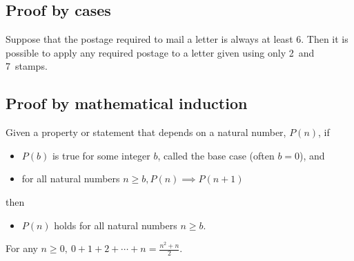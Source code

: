 \subsection{Proof by cases}

\begin{stmt2}
Suppose that the postage required to mail a letter is always at least 6\textcent. 
Then it is possible to apply any required postage to a letter given using only 2\textcent\ and 7\textcent\ stamps.
\end{stmt2}

\subsection{Proof by mathematical induction}

\begin{axiom}
Given a property or statement that depends on a natural number, $P(n)$, if
\begin{itemize}
\item $P(b)$ is true for some integer $b$, called the base case (often $b = 0$), and
\item for all natural numbers $n \geq b, P(n) \implies P(n+1)$
\end{itemize}
then
\begin{itemize}
\item $P(n)$ holds for all natural numbers $n \geq b$.
\end{itemize}
\end{axiom}


\begin{stmt2}
For any $n \geq 0, \ 0 + 1 + 2 + \cdots + n = \frac{n^2 + n}{2}$.
\end{stmt2}

